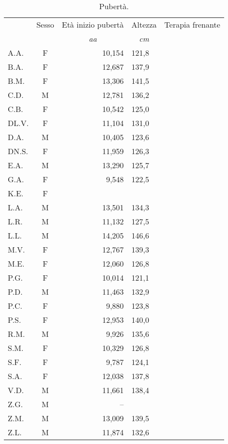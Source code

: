 \begin{table}[!h]
\begin{center}
\begin{tabular}{lcrlc}
\toprule
 & Sesso 	& Età inizio pubertà	& Altezza	& Terapia frenante \\
 & &  \multicolumn{1}{c}{\emph{aa}} 	& \multicolumn{1}{c}{\emph{cm}}			\\
\midrule
A.A.	& F & 10,154 		& 121,8  		& \checkmark \\
B.A.	& F & 12,687 		& 137,9   		&            \\
B.M.	& F & 13,306 		& 141,5   		&            \\
C.D.	& M & 12,781 		& 136,2   		&            \\
C.B.	& F & 10,542 		& 125,0   		& \checkmark \\
DL.V.	& F & 11,104 		& 131,0   		&            \\
D.A.	& M & 10,405 		& 123,6   		& \checkmark \\
DN.S.	& F & 11,959 		& 126,3   		&            \\
E.A.	& M & 13,290 		& 125,7   		&            \\
G.A.	& F & 9,548  		& 122,5   		&            \\
K.E.	& F &        		&    		&            \\
L.A.	& M & 13,501 		& 134,3   		&            \\
L.R.	& M & 11,132 		& 127,5   		&            \\
L.L.	& M & 14,205 		& 146,6   		&            \\
M.V.	& F & 12,767 		& 139,3   		&            \\
M.E.	& F & 12,060 		& 126,8   		&            \\
P.G.	& F & 10,014 		& 121,1   		& \checkmark \\
P.D.	& M & 11,463 		& 132,9   		&            \\
P.C.	& F & 9,880  		& 123,8   		& \checkmark \\
P.S.	& F & 12,953 		& 140,0   		&            \\
R.M.	& M & 9,926  		& 135,6   		& \checkmark \\
S.M.	& F & 10,329 		& 126,8   		& \checkmark \\
S.F.	& F & 9,787  		& 124,1   		&            \\
S.A.	& F & 12,038 		& 137,8   		&            \\
V.D.	& M & 11,661 		& 138,4   		&            \\
Z.G.	& M &   --   		&    		&            \\
Z.M.	& M & 13,009 		& 139,5   		&            \\
Z.L.	& M & 11,874 		& 132,6   		&            \\
\bottomrule
\end{tabular}
\end{center}
\caption{Pubertà.}
\label{tab:Puberta}
\end{table}


